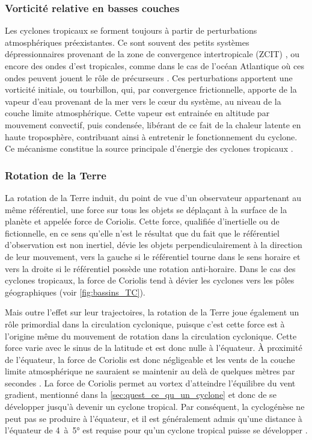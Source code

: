 \documentclass[../main.tex]{subfiles}
\begin{document}
\subsubsection{Vorticité relative en basses couches}

Les cyclones tropicaux se forment toujours à partir de perturbations atmosphériques préexistantes. Ce sont souvent des petits systèmes dépressionnaires provenant de la zone de convergence intertropicale (ZCIT) \parencite{gray_global_1968}, ou encore des ondes d'est tropicales, comme dans le cas de l'océan Atlantique où ces ondes peuvent jouent le rôle de précurseurs \parencite{thorncroft_african_2001,patricola_response_2018}. Ces perturbations apportent une
vorticité initiale, ou tourbillon, qui, par convergence frictionnelle, apporte de la vapeur d'eau provenant de la mer vers le cœur du système, au niveau de la couche limite atmosphérique. Cette vapeur est entrainée en altitude par mouvement convectif, puis condensée, libérant de ce fait de la chaleur latente en haute troposphère, contribuant ainsi à entretenir le fonctionnement du cyclone. Ce mécanisme constitue la source principale d'énergie des cyclones tropicaux \parencite{emanuel_dependence_1987}.

\subsubsection{Rotation de la Terre}

La rotation de la Terre induit, du point de vue d'un observateur appartenant au même référentiel, une force sur tous les objets se déplaçant à la surface de la planète et appelée force de Coriolis. Cette force, qualifiée d'inertielle ou de fictionnelle, en ce sens qu'elle n'est le résultat que du fait que le référentiel d'observation est non inertiel, dévie les objets perpendiculairement à la direction de leur mouvement, vers la gauche si le référentiel tourne dans le sens horaire et vers la droite si le référentiel possède une rotation anti-horaire. Dans le cas
des cyclones tropicaux, la force de Coriolis tend à dévier les cyclones vers les pôles géographiques (voir \cref{fig:bassins_TC}).

Mais outre l'effet sur leur trajectoires, la rotation de la Terre joue également un rôle primordial dans la circulation cyclonique, puisque c'est cette force est à l'origine même du mouvement de rotation dans la circulation cyclonique. Cette force varie avec le sinus de la latitude et est donc nulle à l'équateur. À proximité de l'équateur, la force de Coriolis est donc négligeable et les vents de la couche limite atmosphérique ne sauraient se maintenir au delà de quelques mètres par secondes
\parencite{gray_tropical_1975}. La force de Coriolis permet au vortex d'atteindre l'équilibre du vent gradient, mentionné dans la \cref{sec:quest_ce_qu_un_cyclone} et donc de se développer jusqu'à devenir un cyclone tropical. Par conséquent, la cyclogénèse ne peut pas se produire à l'équateur, et il est généralement admis qu'une distance à l'équateur de \num{4}~à~\ang{5} est requise pour qu'un cyclone tropical puisse se développer \parencite{gray_formation_1998}.
\end{document}
